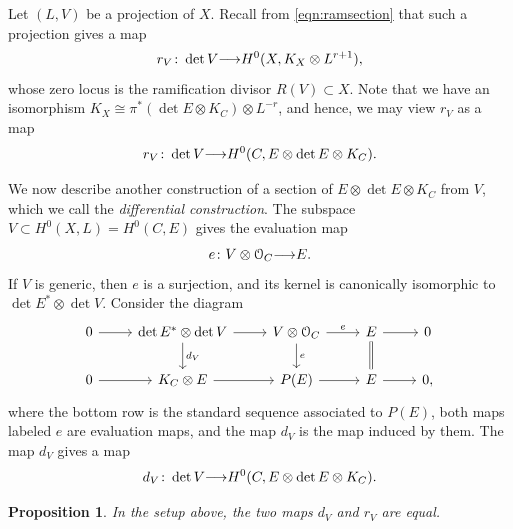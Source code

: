 \documentclass[11pt,reqno]{amsart}
\theoremstyle{plain}
\newtheorem{proposition}[theorem]{Proposition}
\theoremstyle{definition}
\theoremstyle{remark}
\numberwithin{equation}{section}
\renewcommand{\to}{{\longrightarrow}}
\numberwithin{equation}{section}
\renewcommand{\O}{\mathcal O}
\begin{document}
Let $(L, V)$ be a projection of $X$.
Recall from \eqref{eqn:ramsection} that such a projection gives a map
\[ r_V \from \det V \to H^0(X, K_X \otimes L^{r+1}),\]
whose zero locus is the ramification divisor $R(V) \subset X$.
Note that we have an isomorphism $K_X \cong \pi^* (\det E \otimes K_C) \otimes L^{-r}$, and hence, we may view $r_V$ as a map
\[ r_V \from \det V \to H^0(C, E \otimes \det E \otimes K_C).\]

We now describe another construction of a section of $E \otimes \det E \otimes K_C$ from $V$, which we call the \emph{differential construction}.
The subspace $V \subset H^0(X, L) = H^0(C, E)$ gives the evaluation map
\[ e \from V \otimes \O_C \to E.\]
If $V$ is generic, then $e$ is a surjection, and its kernel is canonically isomorphic to $\det E^* \otimes \det V$.
Consider the diagram
\begin{equation}\label{eqn:differential_construction}
\begin{tikzcd}
  0 \arrow{r}& \det E^* \otimes \det V \arrow{r}\arrow{d}{d_V}& V \otimes \O_C \arrow{r}{e}\arrow{d}{e}& E \arrow{r}\arrow[equal]{d}& 0 \\
  0 \arrow{r}& K_C \otimes E \arrow{r}& P(E) \arrow{r}& E \arrow{r}& 0,
\end{tikzcd}
\end{equation}
where the bottom row is the standard sequence associated to $P(E)$, both maps labeled $e$ are evaluation maps, and the map $d_V$ is the map induced by them.
The map $d_V$ gives a map
\[ d_V \from \det V \to H^0(C, E \otimes \det E \otimes K_C).\]
\begin{proposition}\label{prop:rdv}
  In the setup above, the two maps $d_V$ and $r_V$ are equal.
\end{proposition}
\end{document}
